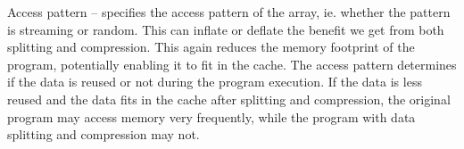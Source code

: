 \item Access pattern -- specifies the access pattern of the array, ie. whether
the pattern is streaming or random. This can inflate or deflate the benefit we
get from both splitting and compression. This again reduces the memory footprint
of the program, potentially enabling it to fit in the cache. The access pattern
determines if the data is reused or not during the program execution. If the
data is less reused and the data fits in the cache after splitting and
compression, the original program may access memory very frequently, while the
program with data splitting and compression may not.

\squishend


